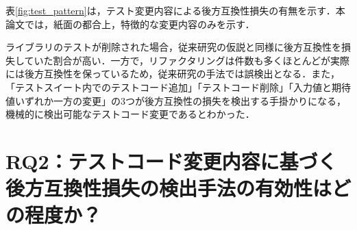 \documentclass[twocolumn]{jarticle} %
\begin{document}
\begin{table*}[t]
\centering
\caption{提案手法と従来手法の比較結果}
\label{fig:result}
\end{table*}


表\ref{fig:test_pattern}は，テスト変更内容による後方互換性損失の有無を示す．本論文では，紙面の都合上，特徴的な変更内容のみを示す．

ライブラリのテストが削除された場合，従来研究の仮説と同様に後方互換性を損失していた割合が高い．一方で，リファクタリングは件数も多くほとんどが実際には後方互換性を保っているため，従来研究の手法では誤検出となる．また，「テストスイート内でのテストコード追加」「テストコード削除」「入力値と期待値いずれか一方の変更」の3つが後方互換性の損失を検出する手掛かりになる，機械的に検出可能なテストコード変更であるとわかった．


\section{RQ2：テストコード変更内容に基づく後方互換性損失の検出手法の有効性はどの程度か？}
\end{document}
